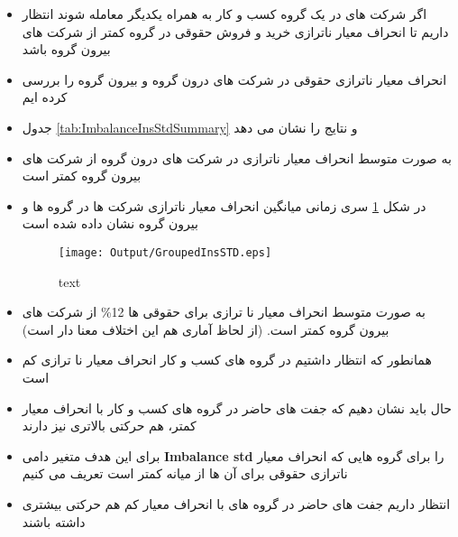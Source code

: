  \begin{itemize}
 	\item 
 	اگر شرکت های در یک گروه کسب و کار به همراه یکدیگر معامله شوند انتظار داریم تا انحراف معیار ناترازی خرید و فروش  حقوقی در گروه کمتر از شرکت های بیرون گروه باشد
 	\item 
 	انحراف معیار ناترازی حقوقی در شرکت های درون گروه و بیرون گروه را بررسی کرده ایم
 		\item 
 	جدول 
 		\ref{tab:ImbalanceInsStdSummary}
 	و
 	نتایج را نشان می دهد
 	\begin{LTR}
 	\end{LTR}

 		\item 
 	به صورت متوسط انحراف معیار ناترازی در شرکت های درون گروه از شرکت های بیرون گروه کمتر است	
 	
 	\item 
 	در شکل 
 	\ref{fig:GroupedInsSTD}
 	سری زمانی میانگین انحراف معیار ناترازی شرکت ها در گروه ها و بیرون گروه نشان داده شده است
 	\begin{figure}[htbp]
 		\centering
 		\caption{text}
 		\texttt{[image: Output/GroupedInsSTD.eps]}
 		\label{fig:GroupedInsSTD}
 	\end{figure}

 	\item 
 	به صورت متوسط انحراف معیار نا ترازی برای حقوقی ها 12\%
 	از شرکت های بیرون گروه کمتر است. (از لحاظ آماری هم این اختلاف معنا دار است)
 	
 \end{itemize}
  

\begin{itemize}
	\item 
	همانطور که انتظار داشتیم در گروه های کسب و کار انحراف معیار نا ترازی کم است
	\item 
	حال باید نشان دهیم که جفت های حاضر  در گروه های کسب و کار با انحراف معیار کمتر، هم حرکتی بالاتری نیز دارند
	\item 
	برای این هدف متغیر دامی 
	\textbf{Imbalance std}
	را برای گروه هایی که انحراف معیار ناترازی حقوقی برای آن ها از میانه کمتر است تعریف می کنیم
%	
	\item 
	انتظار داریم جفت های حاضر در گروه های با انحراف معیار کم هم حرکتی بیشتری داشته باشند
	
\end{itemize}

